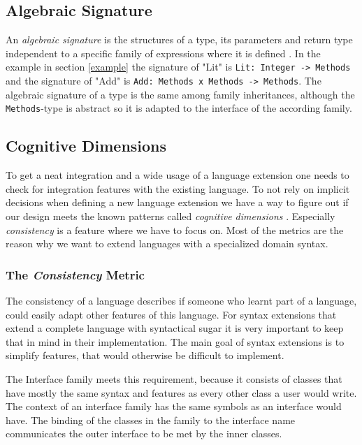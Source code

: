 \documentclass{report}
\begin{document}

\subsection{Algebraic Signature}

An \emph{algebraic signature} is the structures of a type, its parameters and return type independent to a specific family of expressions where it is defined \cite{Oliv-Extensibility-2012}. In the example in section \ref{example} the signature of "Lit" is \lstinline{Lit: Integer -> Methods} and the signature of "Add" is \lstinline{Add: Methods x Methods -> Methods}. The algebraic signature of a type is the same among family inheritances, although the \lstinline{Methods}-type is abstract so it is adapted to the interface of the according family.

\subsection{Cognitive Dimensions}

To get a neat integration and a wide usage of a language extension one needs to check for integration features with the existing language. To not rely on implicit decisions when defining a new language extension we have a way to figure out if our design meets the known patterns called \emph{cognitive dimensions} \cite{Green-Cognitive-1996}. Especially \emph{consistency} is a feature where we have to focus on. Most of the metrics are the reason why we want to extend languages with a specialized domain syntax.


\subsubsection*{The \emph{Consistency} Metric}

The consistency of a language describes if someone who learnt part of a language, could easily adapt other features of this language. For syntax extensions that extend a complete language with syntactical sugar it is very important to keep that in mind in their implementation. The main goal of syntax extensions is to simplify features, that would otherwise be difficult to implement.

The Interface family meets this requirement, because it consists of classes that have mostly the same syntax and features as every other class a user would write. The context of an interface family has the same symbols as an interface would have. The binding of the classes in the family to the interface name communicates the outer interface to be met by the inner classes.
\end{document}

